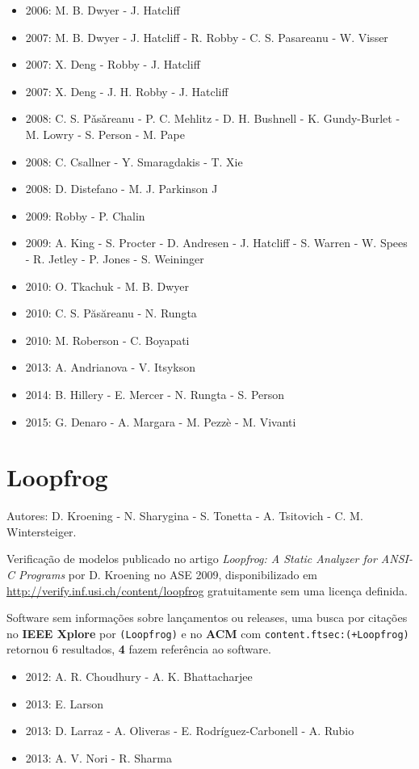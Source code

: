 \begin{itemize}
\item 2006: M. B. Dwyer - J. Hatcliff
\item 2007: M. B. Dwyer - J. Hatcliff - R. Robby - C. S. Pasareanu - W. Visser
\item 2007: X. Deng - Robby - J. Hatcliff
\item 2007: X. Deng - J. H. Robby - J. Hatcliff
\item 2008: C. S. P\v{a}s\v{a}reanu - P. C. Mehlitz - D. H. Bushnell - K. Gundy-Burlet - M. Lowry - S. Person - M. Pape
\item 2008: C. Csallner - Y. Smaragdakis - T. Xie
\item 2008: D. Distefano - M. J. Parkinson J
\item 2009: Robby - P. Chalin
\item 2009: A. King - S. Procter - D. Andresen - J. Hatcliff - S. Warren - W. Spees - R. Jetley - P. Jones - S. Weininger
\item 2010: O. Tkachuk - M. B. Dwyer
\item 2010: C. S. P\u{a}s\u{a}reanu - N. Rungta
\item 2010: M. Roberson - C. Boyapati
\item 2013: A. Andrianova - V. Itsykson
\item 2014: B. Hillery - E. Mercer - N. Rungta - S. Person
\item 2015: G. Denaro - A. Margara - M. Pezz\`{e} - M. Vivanti
\end{itemize}

\section{Loopfrog}

Autores:
D. Kroening - N. Sharygina - S. Tonetta - A. Tsitovich - C. M. Wintersteiger.

Verificação de modelos
publicado no artigo {\it Loopfrog: A Static Analyzer for ANSI-C Programs}
por D. Kroening
no ASE 2009,
disponibilizado em \url{http://verify.inf.usi.ch/content/loopfrog}
gratuitamente
sem uma licença definida.

Software sem informações sobre lançamentos ou releases,
uma busca por citações no {\bf IEEE Xplore} por
\texttt{(Loopfrog)}
e no {\bf ACM} com
\texttt{content.ftsec:(+Loopfrog)}
retornou
6 resultados,
{\bf 4} fazem referência ao software.

\begin{itemize}
\item 2012: A. R. Choudhury - A. K. Bhattacharjee
\item 2013: E. Larson
\item 2013: D. Larraz - A. Oliveras - E. Rodríguez-Carbonell - A. Rubio
\item 2013: A. V. Nori - R. Sharma
\end{itemize}

